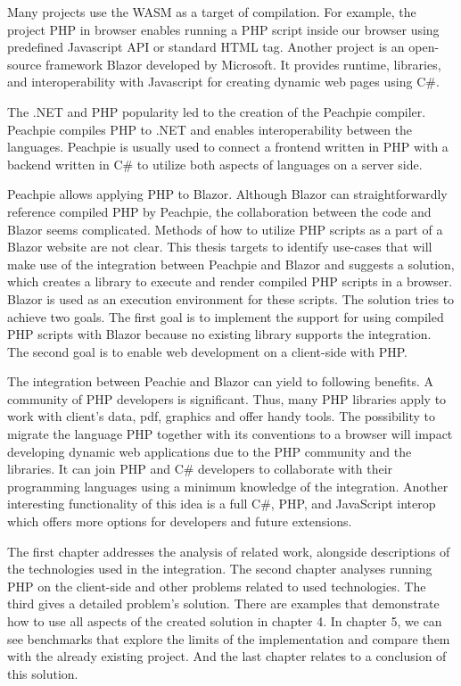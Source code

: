 \par
Many projects use the WASM as a target of compilation.
For example, the project PHP in browser \cite{online:pib} enables running a PHP script inside our browser using predefined Javascript API or standard HTML tag.
Another project is an open-source framework Blazor \cite{online:blazor} developed by Microsoft.
It provides runtime, libraries, and interoperability with Javascript for creating dynamic web pages using C\#.
\par
The .NET and PHP popularity led to the creation of the Peachpie compiler.
Peachpie \cite{online:peachpie} compiles PHP to .NET and enables interoperability between the languages.
Peachpie is usually used to connect a frontend written in PHP with a backend written in C\# to utilize both aspects of languages on a server side.
\par
Peachpie allows applying PHP to Blazor. 
Although Blazor can straightforwardly reference compiled PHP by Peachpie, the collaboration between the code and Blazor seems complicated.
Methods of how to utilize PHP scripts as a part of a Blazor website are not clear. 
This thesis targets to identify use-cases that will make use of the integration between Peachpie and Blazor and suggests a solution, which creates a library to execute and render compiled PHP scripts in a browser.
Blazor is used as an execution environment for these scripts.
The solution tries to achieve two goals.
The first goal is to implement the support for using compiled PHP scripts with Blazor because no existing library supports the integration.
The second goal is to enable web development on a client-side with PHP.
\par
The integration between Peachie and Blazor can yield to following benefits.
A community of PHP developers is significant.
Thus, many PHP libraries apply to work with client's data, pdf, graphics and offer handy tools.
The possibility to migrate the language PHP together with its conventions to a browser will impact developing dynamic web applications due to the PHP community and the libraries.
It can join PHP and C\# developers to collaborate with their programming languages using a minimum knowledge of the integration.
Another interesting functionality of this idea is a full C\#, PHP, and JavaScript interop which offers more options for developers and future extensions.
\par
The first chapter addresses the analysis of related work, alongside descriptions of the technologies used in the integration.
The second chapter analyses running PHP on the client-side and other problems related to used technologies.
The third gives a detailed problem's solution.
There are examples that demonstrate how to use all aspects of the created solution in chapter 4.
In chapter 5, we can see benchmarks that explore the limits of the implementation and compare them with the already existing project.
And the last chapter relates to a conclusion of this solution.
